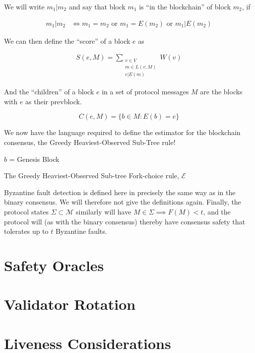 \documentclass{article}
\theoremstyle{definition}
\begin{document}
We will write $m_1 | m_2$ and say that block $m_1$ is ``in the blockchain'' of block $m_2$, if 

\begin{align}
	m_1 | m_2 &\iff m_1 = m_2 \text{ or } m_1 = E(m_2) \text{ or } m_1 | E(m_2) 
\end{align}

We can then define the ``score'' of a block $e$ as

\begin{align}
S(e, M) = \sum_{\substack{v \in V \\ m \in L(v,M) \\ e|E(m)}} W(v)
\end{align}

And the ``children'' of a block $e$ in a set of protocol messages $M$ are the blocks with $e$ as their prevblock.

$$
C(e,M) = \{b \in M : E(b) = e\}
$$

We now have the language required to define the estimator for the blockchain consensus, the Greedy Heaviest-Observed Sub-Tree rule!

\begin{algorithm}[H]
 $b$ = Genesis Block


\caption{The Greedy Heaviest-Observed Sub-tree Fork-choice rule, $\mathcal{E}$}
\end{algorithm}

Byzantine fault detection is defined here in precisely the same way as in the binary consensus. We will therefore not give the definitions again. Finally, the protocol states $\Sigma \subset \mathcal{M}$ similarly will have $M \in \Sigma \implies F(M) < t$, and the protocol will (as with the binary consensus) thereby have consensus safety that tolerates up to $t$ Byzantine faults.

\section{Safety Oracles}

\section{Validator Rotation}

\section{Liveness Considerations}



\end{document}
